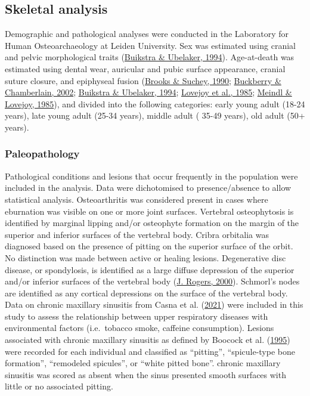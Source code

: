 \documentclass[
  letterpaper,
]{book}
\begin{document}
\hypertarget{skeletal-analysis}{%
\subsection{Skeletal analysis}\label{skeletal-analysis}}

Demographic and pathological analyses were conducted in the Laboratory
for Human Osteoarchaeology at Leiden University. Sex was estimated using
cranial and pelvic morphological traits
(\protect\hyperlink{ref-Standards1994}{Buikstra \& Ubelaker, 1994}).
Age-at-death was estimated using dental wear, auricular and pubic
surface appearance, cranial suture closure, and epiphyseal fusion
(\protect\hyperlink{ref-SucheyBrooks1990}{Brooks \& Suchey, 1990};
\protect\hyperlink{ref-buckberryAuricular2002}{Buckberry \& Chamberlain,
2002}; \protect\hyperlink{ref-Standards1994}{Buikstra \& Ubelaker,
1994}; \protect\hyperlink{ref-lovejoyAuricular1985}{Lovejoy et al.,
1985}; \protect\hyperlink{ref-meindlSutureClosure1985}{Meindl \&
Lovejoy, 1985}), and divided into the following categories: early young
adult (18-24 years), late young adult (25-34 years), middle adult (
35-49 years), old adult (50+ years).

\hypertarget{paleopathology}{%
\subsubsection{Paleopathology}\label{paleopathology}}

Pathological conditions and lesions that occur frequently in the
population were included in the analysis. Data were dichotomised to
presence/absence to allow statistical analysis. Osteoarthritis was
considered present in cases where eburnation was visible on one or more
joint surfaces. Vertebral osteophytosis is identified by marginal
lipping and/or osteophyte formation on the margin of the superior and
inferior surfaces of the vertebral body. Cribra orbitalia was diagnosed
based on the presence of pitting on the superior surface of the orbit.
No distinction was made between active or healing lesions. Degenerative
disc disease, or spondylosis, is identified as a large diffuse
depression of the superior and/or inferior surfaces of the vertebral
body (\protect\hyperlink{ref-rogersPalaeopathologyJoint2000}{J. Rogers,
2000}). Schmorl's nodes are identified as any cortical depressions on
the surface of the vertebral body. Data on chronic maxillary sinusitis
from Casna et al.
(\protect\hyperlink{ref-casnaUrbanizationRespiratory2021}{2021}) were
included in this study to assess the relationship between upper
respiratory diseases with environmental factors (i.e.~tobacco smoke,
caffeine consumption). Lesions associated with chronic maxillary
sinusitis as defined by Boocock et al.
(\protect\hyperlink{ref-boocockMaxillarySinusitis1995}{1995}) were
recorded for each individual and classified as ``pitting'',
``spicule-type bone formation'', ``remodeled spicules'', or ``white
pitted bone''. chronic maxillary sinusitis was scored as absent when the
sinus presented smooth surfaces with little or no associated pitting.
\end{document}
